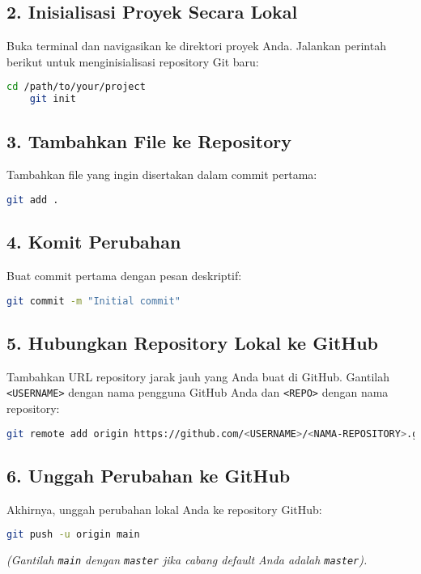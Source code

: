 \subsection{2. Inisialisasi Proyek Secara Lokal}
Buka terminal dan navigasikan ke direktori proyek Anda. Jalankan perintah berikut untuk menginisialisasi repository Git baru:

\begin{lstlisting}[language=bash]
	cd /path/to/your/project
	git init
\end{lstlisting}

\subsection{3. Tambahkan File ke Repository}
Tambahkan file yang ingin disertakan dalam commit pertama:

\begin{lstlisting}[language=bash]
	git add .
\end{lstlisting}

\subsection{4. Komit Perubahan}
Buat commit pertama dengan pesan deskriptif:

\begin{lstlisting}[language=bash]
	git commit -m "Initial commit"
\end{lstlisting}

\subsection{5. Hubungkan Repository Lokal ke GitHub}
Tambahkan URL repository jarak jauh yang Anda buat di GitHub. Gantilah \texttt{<USERNAME>} dengan nama pengguna GitHub Anda dan \texttt{<REPO>} dengan nama repository:

\begin{lstlisting}[language=bash]
	git remote add origin https://github.com/<USERNAME>/<NAMA-REPOSITORY>.git
\end{lstlisting}

\subsection{6. Unggah Perubahan ke GitHub}
Akhirnya, unggah perubahan lokal Anda ke repository GitHub:

\begin{lstlisting}[language=bash]
	git push -u origin main
\end{lstlisting}
\textit{(Gantilah \texttt{main} dengan \texttt{master} jika cabang default Anda adalah \texttt{master}).}

